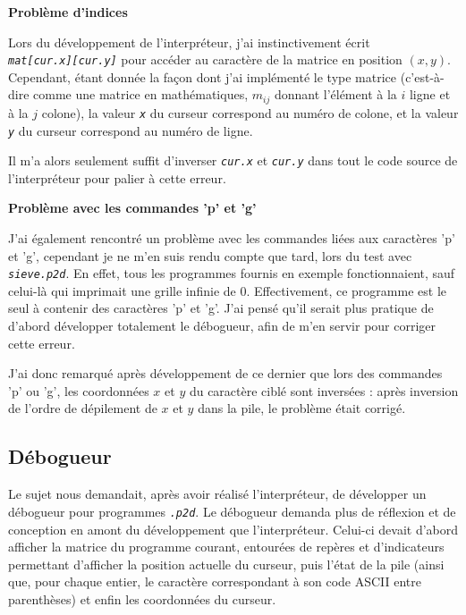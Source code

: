 \documentclass[a4paper,11pt]{article}
\newcommand{\code}[1]{{\itshape\lstinline{#1}}}
\begin{document}
{\small\textbf{Problème d'indices}}

Lors du développement de l'interpréteur, j'ai instinctivement écrit \\\code{mat[cur.x][cur.y]} pour accéder au caractère de la matrice en position $(x, y)$. Cependant, étant donnée la façon dont j'ai implémenté le type matrice (c'est-à-dire comme une matrice en mathématiques, $m_{ij}$ donnant l'élément à la $i$ ligne et à la $j$ colone), la valeur \code{x} du curseur correspond au numéro de colone, et la valeur \code{y} du curseur correspond au numéro de ligne.

Il m'a alors seulement suffit d'inverser \code{cur.x} et \code{cur.y} dans tout le code source de l'interpréteur pour palier à cette erreur.

\bigskip

{\small\textbf{Problème avec les commandes 'p' et 'g'}}

J'ai également rencontré un problème avec les commandes liées aux caractères 'p' et 'g', cependant je ne m'en suis rendu compte que tard, lors du test avec \code{sieve.p2d}. En effet, tous les programmes fournis en exemple fonctionnaient, sauf celui-là qui imprimait une grille infinie de 0. Effectivement, ce programme est le seul à contenir des caractères 'p' et 'g'. J'ai pensé qu'il serait plus pratique de d'abord développer totalement le débogueur, afin de m'en servir pour corriger cette erreur.

J'ai donc remarqué après développement de ce dernier que lors des commandes 'p' ou 'g', les coordonnées $x$ et $y$ du caractère ciblé sont inversées : après inversion de l'ordre de dépilement de $x$ et $y$ dans la pile, le problème était corrigé.



\subsection*{Débogueur}

Le sujet nous demandait, après avoir réalisé l'interpréteur, de développer un débogueur pour programmes \code{.p2d}. Le débogueur demanda plus de réflexion et de conception en amont du développement que l'interpréteur. Celui-ci devait d'abord afficher la matrice du programme courant, entourées de repères et d'indicateurs permettant d'afficher la position actuelle du curseur, puis l'état de la pile (ainsi que, pour chaque entier, le caractère correspondant à son code ASCII entre parenthèses) et enfin les coordonnées du curseur.
\end{document}
